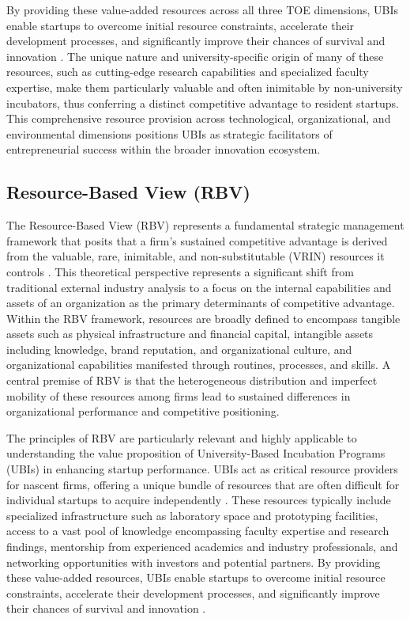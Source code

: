 \documentclass[../Main.tex]{subfiles}
\begin{document}
By providing these value-added resources across all three TOE dimensions, UBIs enable startups to overcome initial resource constraints, accelerate their development processes, and significantly improve their chances of survival and innovation \cite{mian1996assessing}. The unique nature and university-specific origin of many of these resources, such as cutting-edge research capabilities and specialized faculty expertise, make them particularly valuable and often inimitable by non-university incubators, thus conferring a distinct competitive advantage to resident startups. This comprehensive resource provision across technological, organizational, and environmental dimensions positions UBIs as strategic facilitators of entrepreneurial success within the broader innovation ecosystem.

\subsection{Resource-Based View (RBV)}

The Resource-Based View (RBV) represents a fundamental strategic management framework that posits that a firm's sustained competitive advantage is derived from the valuable, rare, inimitable, and non-substitutable (VRIN) resources it controls \cite{barney1991firm}. This theoretical perspective represents a significant shift from traditional external industry analysis to a focus on the internal capabilities and assets of an organization as the primary determinants of competitive advantage. Within the RBV framework, resources are broadly defined to encompass tangible assets such as physical infrastructure and financial capital, intangible assets including knowledge, brand reputation, and organizational culture, and organizational capabilities manifested through routines, processes, and skills. A central premise of RBV is that the heterogeneous distribution and imperfect mobility of these resources among firms lead to sustained differences in organizational performance and competitive positioning.

The principles of RBV are particularly relevant and highly applicable to understanding the value proposition of University-Based Incubation Programs (UBIs) in enhancing startup performance. UBIs act as critical resource providers for nascent firms, offering a unique bundle of resources that are often difficult for individual startups to acquire independently \cite{mian1996assessing}. These resources typically include specialized infrastructure such as laboratory space and prototyping facilities, access to a vast pool of knowledge encompassing faculty expertise and research findings, mentorship from experienced academics and industry professionals, and networking opportunities with investors and potential partners. By providing these value-added resources, UBIs enable startups to overcome initial resource constraints, accelerate their development processes, and significantly improve their chances of survival and innovation \cite{mian1996assessing}.
\end{document}

